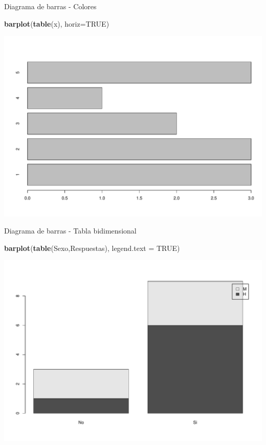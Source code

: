\documentclass[
  ignorenonframetext,
]{beamer}
\newenvironment{Shaded}{\begin{snugshade}}{\end{snugshade}}
\newcommand{\AttributeTok}[1]{\textcolor[rgb]{0.13,0.29,0.53}{#1}}
\newcommand{\ConstantTok}[1]{\textcolor[rgb]{0.56,0.35,0.01}{#1}}
\newcommand{\FunctionTok}[1]{\textcolor[rgb]{0.13,0.29,0.53}{\textbf{#1}}}
\newcommand{\NormalTok}[1]{#1}
\begin{document}
\begin{frame}[fragile]{Diagrama de barras - Colores}
\label{diagrama-de-barras---colores-1}
\begin{Shaded}
\begin{Highlighting}[]
\FunctionTok{barplot}\NormalTok{(}\FunctionTok{table}\NormalTok{(x), }\AttributeTok{horiz=}\ConstantTok{TRUE}\NormalTok{)}
\end{Highlighting}
\end{Shaded}

\includegraphics{R_base_files/figure-beamer/unnamed-chunk-88-1.pdf}
\end{frame}

\begin{frame}[fragile]{Diagrama de barras - Tabla bidimensional}
\label{diagrama-de-barras---tabla-bidimensional}
\begin{Shaded}
\begin{Highlighting}[]
\FunctionTok{barplot}\NormalTok{(}\FunctionTok{table}\NormalTok{(Sexo,Respuestas), }\AttributeTok{legend.text =} \ConstantTok{TRUE}\NormalTok{)}
\end{Highlighting}
\end{Shaded}

\includegraphics{R_base_files/figure-beamer/unnamed-chunk-89-1.pdf}
\end{frame}
\end{document}

